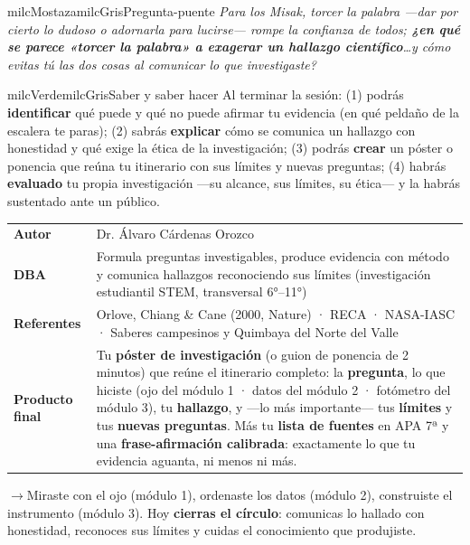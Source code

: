 \documentclass[11pt,letterpaper]{article}
\newcommand{\puente}[1]{%
  \begin{puentebox}%
    \textcolor{milcGradeDark}{$\rightarrow$}\hspace{2mm}#1%
  \end{puentebox}%
}
\begin{document}
\begin{softbox}{milcMostaza}{milcGris}{Pregunta-puente}
\textit{Para los Misak, torcer la palabra ---dar por cierto lo dudoso o adornarla para lucirse--- rompe la confianza de todos; \textbf{¿en qué se parece «torcer la palabra» a exagerar un hallazgo científico}\ldots y cómo evitas tú las dos cosas al comunicar lo que investigaste?}
\end{softbox}

\begin{softbox}{milcVerde}{milcGris}{Saber y saber hacer}
Al terminar la sesión: (1) podrás \textbf{identificar} qué puede y qué no puede afirmar tu evidencia (en qué peldaño de la escalera te paras); (2) sabrás \textbf{explicar} cómo se comunica un hallazgo con honestidad y qué exige la ética de la investigación; (3) podrás \textbf{crear} un póster o ponencia que reúna tu itinerario con sus límites y nuevas preguntas; (4) habrás \textbf{evaluado} tu propia investigación ---su alcance, sus límites, su ética--- y la habrás sustentado ante un público.
\end{softbox}



\small
\begin{tabularx}{\textwidth}{>{\bfseries}p{3.0cm}Y}
Autor & Dr. Álvaro Cárdenas Orozco\\
DBA & Formula preguntas investigables, produce evidencia con método y comunica hallazgos reconociendo sus límites (investigación estudiantil STEM, transversal 6°--11°)\\
Referentes & Orlove, Chiang \& Cane (2000, Nature) · RECA · NASA-IASC · Saberes campesinos y Quimbaya del Norte del Valle\\
Producto final & Tu \textbf{póster de investigación} (o guion de ponencia de 2 minutos) que reúne el itinerario completo: la \textbf{pregunta}, lo que hiciste (ojo del módulo 1 · datos del módulo 2 · fotómetro del módulo 3), tu \textbf{hallazgo}, y ---lo más importante--- tus \textbf{límites} y tus \textbf{nuevas preguntas}. Más tu \textbf{lista de fuentes} en APA 7ª y una \textbf{frase-afirmación calibrada}: exactamente lo que tu evidencia aguanta, ni menos ni más.\\
\end{tabularx}
\normalsize

\puente{Miraste con el ojo (módulo 1), ordenaste los datos (módulo 2), construiste el instrumento (módulo 3). Hoy \textbf{cierras el círculo}: comunicas lo hallado con honestidad, reconoces sus límites y cuidas el conocimiento que produjiste.}
\end{document}

